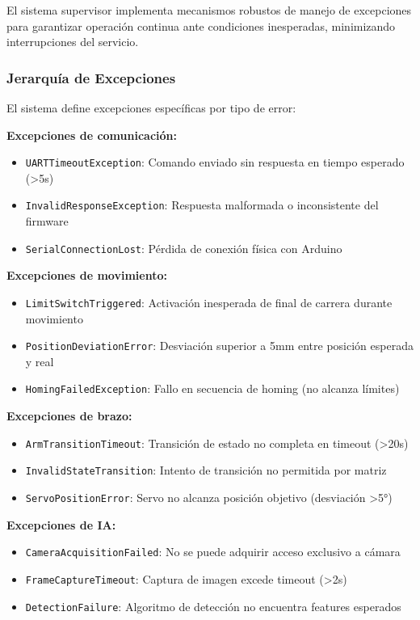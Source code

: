 El sistema supervisor implementa mecanismos robustos de manejo de excepciones para garantizar operación continua ante condiciones inesperadas, minimizando interrupciones del servicio.

\subsubsection{Jerarquía de Excepciones}

El sistema define excepciones específicas por tipo de error:

\textbf{Excepciones de comunicación:}
\begin{itemize}[label=$\bullet$]
    \item \texttt{UARTTimeoutException}: Comando enviado sin respuesta en tiempo esperado (>5s)
    \item \texttt{InvalidResponseException}: Respuesta malformada o inconsistente del firmware
    \item \texttt{SerialConnectionLost}: Pérdida de conexión física con Arduino
\end{itemize}

\textbf{Excepciones de movimiento:}
\begin{itemize}[label=$\bullet$]
    \item \texttt{LimitSwitchTriggered}: Activación inesperada de final de carrera durante movimiento
    \item \texttt{PositionDeviationError}: Desviación superior a 5mm entre posición esperada y real
    \item \texttt{HomingFailedException}: Fallo en secuencia de homing (no alcanza límites)
\end{itemize}

\textbf{Excepciones de brazo:}
\begin{itemize}[label=$\bullet$]
    \item \texttt{ArmTransitionTimeout}: Transición de estado no completa en timeout (>20s)
    \item \texttt{InvalidStateTransition}: Intento de transición no permitida por matriz
    \item \texttt{ServoPositionError}: Servo no alcanza posición objetivo (desviación >5°)
\end{itemize}

\textbf{Excepciones de IA:}
\begin{itemize}[label=$\bullet$]
    \item \texttt{CameraAcquisitionFailed}: No se puede adquirir acceso exclusivo a cámara
    \item \texttt{FrameCaptureTimeout}: Captura de imagen excede timeout (>2s)
    \item \texttt{DetectionFailure}: Algoritmo de detección no encuentra features esperados
\end{itemize}

